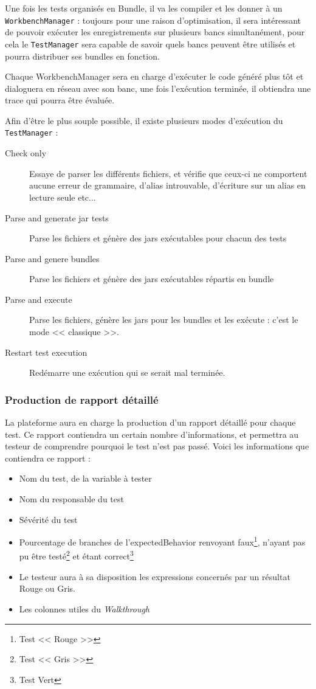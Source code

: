 	Une fois les tests organisés en Bundle, il va les compiler et les donner à un \texttt{WorkbenchManager} : toujours pour une raison d'optimisation, il sera intéressant de pouvoir exécuter les enregistrements sur plusieurs bancs simultanément, pour cela le \texttt{TestManager} sera capable de savoir quels bancs peuvent être utilisés et pourra distribuer ses bundles en fonction. 

	Chaque WorkbenchManager sera en charge d'exécuter le code généré plus tôt et dialoguera en réseau avec son banc, une fois l'exécution terminée, il obtiendra une trace qui pourra être évaluée.

	Afin d'être le plus souple possible, il existe plusieurs modes d'exécution du \texttt{TestManager} : 
	\begin{description}
		\item[Check only] Essaye de parser les différents fichiers, et vérifie que ceux-ci ne comportent aucune erreur de grammaire, d'alias introuvable, d'écriture sur un alias en lecture seule etc...
		\item[Parse and generate jar tests] Parse les fichiers et génère des jars exécutables pour chacun des tests
		\item[Parse and genere bundles] Parse les fichiers et génère des jars exécutables répartis en bundle
		\item[Parse and execute] Parse les fichiers, génère les jars pour les bundles et les exécute : c'est le mode << classique >>.
		\item[Restart test execution] Redémarre une exécution qui se serait mal terminée.
	\end{description}
	\subsubsection{Production de rapport détaillé}\label{report}
	La plateforme aura en charge la production d'un rapport détaillé pour chaque test. Ce rapport contiendra un certain nombre d'informations, et permettra au testeur de comprendre pourquoi le test n'est pas passé. Voici les informations que contiendra ce rapport : 

	\begin{itemize}
		\item Nom du test, de la variable à tester
		\item Nom du responsable du test
		\item Sévérité du test
		\item Pourcentage de branches de l'expectedBehavior renvoyant faux\footnote{Test << Rouge >>}, n'ayant pas pu être testé\footnote{Test << Gris >>} et étant correct\footnote{Test Vert}
		\item Le testeur aura à sa disposition les expressions concernés par un résultat Rouge ou Gris.
		\item Les colonnes utiles du \textit{Walkthrough}
	\end{itemize}

